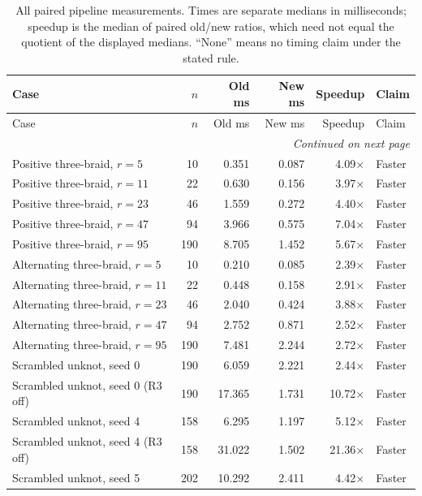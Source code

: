\begingroup
\small
\setlength{\tabcolsep}{4pt}
\begin{longtable}{@{}p{}rrrrl@{}}
\caption{All paired pipeline measurements. Times are separate medians in
milliseconds; speedup is the median of paired old/new ratios, which need
not equal the quotient of the displayed medians. ``None'' means no timing
claim under the stated rule.}\label{tab:paired}\\
\toprule
Case & \(n\) & Old ms & New ms & Speedup & Claim\\
\midrule
\endfirsthead
\toprule
Case & \(n\) & Old ms & New ms & Speedup & Claim\\
\midrule
\endhead
\midrule
\multicolumn{6}{r}{\emph{Continued on next page}}\\
\endfoot
\bottomrule
\endlastfoot
Positive three-braid, \(r=5\) & 10 & 0.351 & 0.087 & 4.09\(\times\) & Faster \\
Positive three-braid, \(r=11\) & 22 & 0.630 & 0.156 & 3.97\(\times\) & Faster \\
Positive three-braid, \(r=23\) & 46 & 1.559 & 0.272 & 4.40\(\times\) & Faster \\
Positive three-braid, \(r=47\) & 94 & 3.966 & 0.575 & 7.04\(\times\) & Faster \\
Positive three-braid, \(r=95\) & 190 & 8.705 & 1.452 & 5.67\(\times\) & Faster \\
Alternating three-braid, \(r=5\) & 10 & 0.210 & 0.085 & 2.39\(\times\) & Faster \\
Alternating three-braid, \(r=11\) & 22 & 0.448 & 0.158 & 2.91\(\times\) & Faster \\
Alternating three-braid, \(r=23\) & 46 & 2.040 & 0.424 & 3.88\(\times\) & Faster \\
Alternating three-braid, \(r=47\) & 94 & 2.752 & 0.871 & 2.52\(\times\) & Faster \\
Alternating three-braid, \(r=95\) & 190 & 7.481 & 2.244 & 2.72\(\times\) & Faster \\
Scrambled unknot, seed 0 & 190 & 6.059 & 2.221 & 2.44\(\times\) & Faster \\
Scrambled unknot, seed 0 (R3 off) & 190 & 17.365 & 1.731 & 10.72\(\times\) & Faster \\
Scrambled unknot, seed 4 & 158 & 6.295 & 1.197 & 5.12\(\times\) & Faster \\
Scrambled unknot, seed 4 (R3 off) & 158 & 31.022 & 1.502 & 21.36\(\times\) & Faster \\
Scrambled unknot, seed 5 & 202 & 10.292 & 2.411 & 4.42\(\times\) & Faster \\

\end{longtable}

